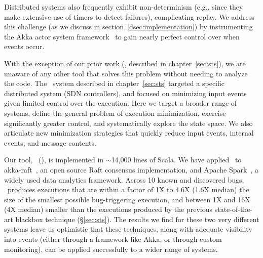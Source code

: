 Distributed systems also frequently exhibit non-determinism (e.g., since they
make extensive use of timers to detect failures), complicating replay. We address this
challenge (as we discuss in
section~\ref{dsec:implementation}) by
instrumenting the Akka actor system framework~\cite{akka} to gain nearly perfect control over when
events occur.

With the exception of our prior work (\cite{sts2014}, described in
chapter~\ref{sec:sts}), we are unaware of any other
tool that solves this problem without needing to analyze the code.
The \projectname~system described in chapter~\ref{sec:sts} targeted a specific distributed system (SDN controllers), and focused
on minimizing input events given limited control over the execution.
Here we target a broader range of systems, define the
general problem of execution minimization, exercise significantly greater
control, and systematically explore the state space. We also articulate new minimization
strategies that quickly reduce input events,
internal events, and message contents.



Our tool, \system~(\sys), is implemented in {\footnotesize $\sim$}14,000
lines of Scala. We have applied \sys~to akka-raft~\cite{akka-raft}, an open
source Raft consensus implementation, and Apache Spark~\cite{zaharia2012resilient}, a widely used data analytics framework.
Across 10 known and discovered bugs, \sys~produces executions that are within
a factor of 1X to 4.6X (1.6X median) the size of the smallest possible
bug-triggering execution,
and between 1X and 16X (4X median) smaller than the
executions produced by the previous state-of-the-art blackbox technique
(\S\ref{sec:sts}).
The results we find for these two very different systems leave us optimistic that these
techniques, along with adequate visibility into events (either through a
framework like Akka, or through
custom monitoring), can be applied successfully to a wider range of systems.


